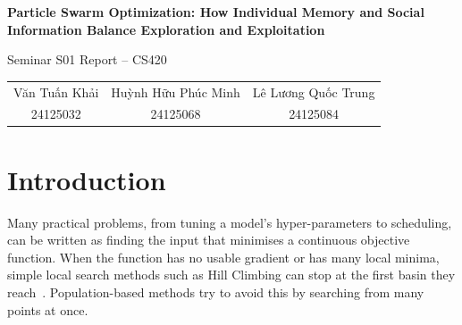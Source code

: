 \documentclass[11pt,a4paper]{article}
\begin{document}
\begin{center}
{\LARGE\bfseries Particle Swarm Optimization: How Individual Memory and Social Information Balance Exploration and Exploitation\par}
\vspace{4pt}
{\large Seminar S01 Report -- CS420\par}
\vspace{1.4em}
\begin{tabular}{ccc}
Văn Tuấn Khải & Huỳnh Hữu Phúc Minh & Lê Lương Quốc Trung\\[1pt]
{\small 24125032} & {\small 24125068} & {\small 24125084}
\end{tabular}
\end{center}

\begin{abstract}
\noindent Particle Swarm Optimization (PSO) searches a continuous space with a population of particles that are pulled towards their own best positions and towards the best position found by the swarm. This report reviews the original algorithm of Kennedy and Eberhart~\cite{kennedy1995} and the later changes surveyed by Poli et al.~\cite{poli2007}, then studies how PSO balances exploration and exploitation on two 2-D benchmark functions, the unimodal Sphere and the multimodal Rastrigin. We give two worked examples, compare three inertia weights ($\omega=0.4,0.7,0.9$) over five seeds, and compare PSO with Random Search and Hill Climbing under an equal budget of 2,020 function evaluations. With $\omega=0.7$, PSO reached a mean final fitness of $1.0\times10^{-12}$ on Sphere and $1.1\times10^{-6}$ on Rastrigin, and it was the only method to reach a fitness of 0.01 on Rastrigin. The lowest inertia weight gave the best final fitness on both functions, but with a tighter velocity limit one Rastrigin run stalled in a local minimum, so the inertia ranking depends on that limit. A diagnostic run with a strong social pull showed swarm diversity collapsing around a suboptimal basin. These small experiments illustrate rather than establish general behaviour.
\end{abstract}

\section{Introduction}
Many practical problems, from tuning a model's hyper-parameters to scheduling, can be written as finding the input that minimises a continuous objective function. When the function has no usable gradient or has many local minima, simple local search methods such as Hill Climbing can stop at the first basin they reach~\cite{nguyen2025}. Population-based methods try to avoid this by searching from many points at once.
\end{document}
